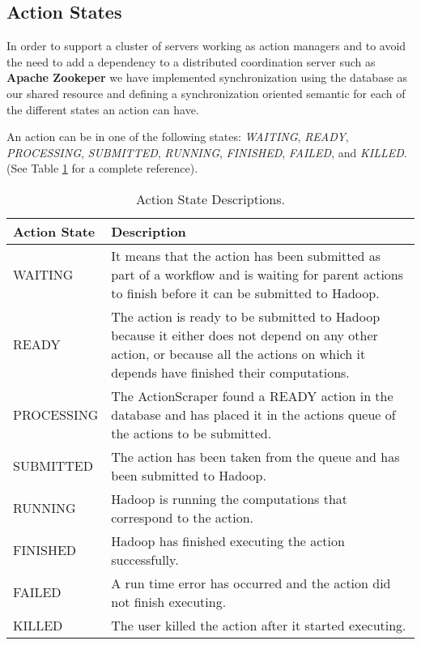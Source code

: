 \subsection{Action States}
In order to support a cluster of servers working as action managers and to avoid the need to add a dependency to a distributed coordination server such as \textbf{Apache Zookeper} we have implemented synchronization using the database as our shared resource and defining a synchronization oriented semantic for each of the different states an action can have.

An action can be in one of the following states: \textit{WAITING}, \textit{READY}, \textit{PROCESSING}, \textit{SUBMITTED}, \textit{RUNNING}, \textit{FINISHED}, \textit{FAILED}, and \textit{KILLED}.  (See Table \ref{tab:action_states} for a complete reference).

\begin{table}
\begin{tabular}{| l | p{12cm} |}

\hline
\textbf{Action State} & \textbf{Description} \\ \hline
WAITING & It means that the action has been submitted as part of a workflow and is waiting for parent actions to finish before it can be submitted to Hadoop.\\ \hline
READY & The action is ready to be submitted to Hadoop because it either does not depend on any other action, or because all the actions on which it depends have finished their computations. \\ \hline
PROCESSING & The ActionScraper found a READY action in the database and has placed it in the actions queue of the actions to be submitted. \\ \hline
SUBMITTED & The action has been taken from the queue and has been submitted to Hadoop. \\ \hline
RUNNING & Hadoop is running the computations that correspond to the action. \\ \hline
FINISHED & Hadoop has finished executing the action successfully.\\ \hline
FAILED & A run time error has occurred and the action did not finish executing.\\ \hline
KILLED & The user killed the action after it started executing.\\ \hline
\end{tabular}
\caption{Action State Descriptions.\label{tab:action_states}}
\end{table}

